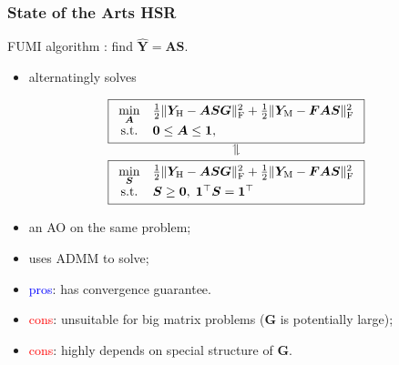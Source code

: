 \documentclass[10pt,mathserif]{beamer}
\newcommand{\YH}{\bm Y_\text H}
\newcommand{\YM}{\bm Y_\text M}
\newcommand{\Tr}{^\top}%
\newcommand{\Fr}{_\text F}
\begin{document}
    \begin{frame}
        \frametitle{State of the Arts HSR}
        FUMI algorithm \cite{FUMI}: find $\hat{\bm Y} = \bm A \bm S$.
        \begin{itemize}
            \item alternatingly solves \newline
        \end{itemize}
        \[\begin{array}{c}
          \boxed{
             \begin{array}{cl}
                 \underset{\bm A}{\min}
                 &
                 \frac{1}{2} \Vert \YH - \bm A \bm S \bm G \Vert\Fr^2
                 +
                 \frac{1}{2} \Vert \YM - \bm F \bm A \bm S \Vert\Fr^2 \\
                 \text{s.t.}
                 &
                 \bm 0 \leq \bm A \leq \bm 1,
             \end{array}
          } \\
          \text{\rotatebox{90}{$\rightleftharpoons$}} \\
          \boxed{
             \begin{array}{cl}
                 \underset{\bm S}{\min}
                 &
                 \frac{1}{2} \Vert \YH - \bm A \bm S \bm G \Vert\Fr^2
                 +
                 \frac{1}{2} \Vert \YM - \bm F \bm A \bm S \Vert\Fr^2 \\
                 \text{s.t.}
                 &
                 \bm S \geq \bm 0, \; \bm 1\Tr \bm S = \bm 1\Tr
             \end{array}
          }
          \end{array}\]
        \begin{itemize}
            \item an AO on the same problem;
            \item uses ADMM to solve;
            \item \textcolor{blue}{pros}: has convergence guarantee.
            \item \textcolor{red}{cons}: unsuitable for big matrix problems ($\bm G$ is potentially large);
            \item \textcolor{red}{cons}: highly depends on special structure of $\bm G$.
        \end{itemize}
    \end{frame}
\end{document}
